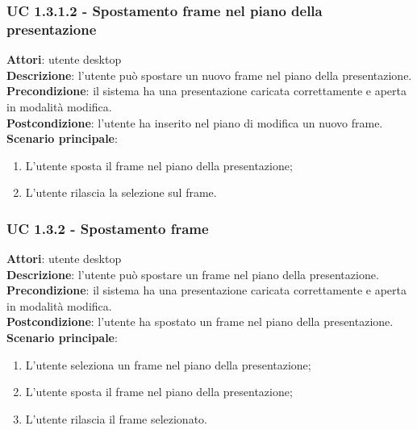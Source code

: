 \subsubsection{UC 1.3.1.2 - Spostamento frame nel piano della presentazione}{
	\label{uc1.3.1.2}
	\textbf{Attori}: utente desktop \\
	\textbf{Descrizione}: l'utente può spostare un nuovo frame nel piano della presentazione. \\
	\textbf{Precondizione}: il sistema ha una presentazione caricata correttamente e aperta in modalità modifica.	\\
	\textbf{Postcondizione}: l'utente ha inserito nel piano di modifica un nuovo frame.	\\
	\textbf{Scenario principale}:
	\begin{enumerate}
		\item L'utente sposta il frame nel piano della presentazione;
		\item L'utente rilascia la selezione sul frame.
	\end{enumerate}
	}
\subsubsection{UC 1.3.2 - Spostamento frame}{
	\label{uc1.3.2}
	\textbf{Attori}: utente desktop \\
	\textbf{Descrizione}: l'utente può spostare un frame nel piano della presentazione. \\
	\textbf{Precondizione}: il sistema ha una presentazione caricata correttamente e aperta in modalità modifica.	\\
	\textbf{Postcondizione}: l'utente ha spostato un frame nel piano della presentazione.	\\
	\textbf{Scenario principale}:
	\begin{enumerate}
		\item L'utente seleziona un frame nel piano della presentazione;
		\item L'utente sposta il frame nel piano della presentazione;
		\item L'utente rilascia il frame selezionato.
	\end{enumerate}
	}
